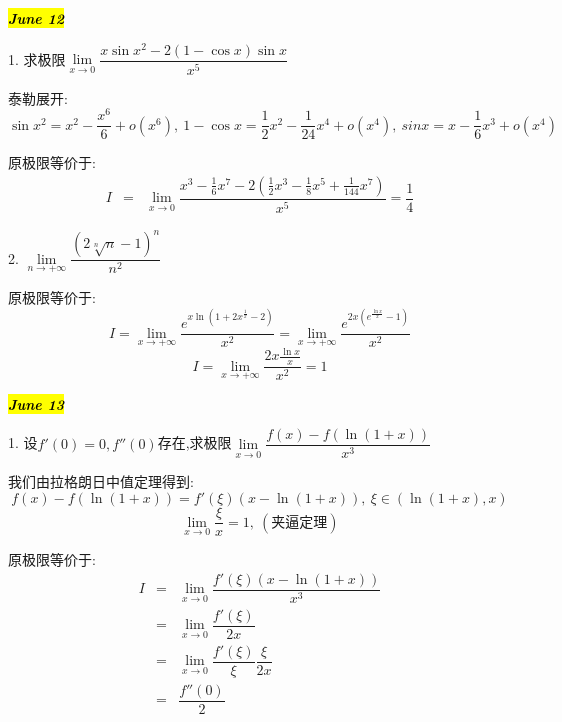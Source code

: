 \hl{\textbf{\textit{June 12}}}

1. 求极限$\lim\limits_{x\rightarrow 0 }\dfrac{x\sin x^2-2(1-\cos x)\sin x}{x^5}$
\begin{solution}
	
	泰勒展开: 
	$$\sin x^2=x^2-\dfrac{x^6}{6}+o(x^6),\ 1-\cos x=\dfrac{1}{2}x^2-\dfrac{1}{24}x^4+o(x^4),\ sin x=x-\dfrac{1}{6}x^3+o(x^4)$$
	
	原极限等价于: 
	\begin{eqnarray*}
		I&=&\lim\limits_{x\rightarrow 0}\dfrac{x^3-\frac{1}{6}x^7-2(\frac{1}{2}x^3-\frac{1}{8}x^5+\frac{1}{144}x^7)}{x^5}=\dfrac{1}{4}
	\end{eqnarray*}
\end{solution}

2. $\lim\limits_{n\rightarrow +\infty}\dfrac{(2\sqrt[n]{n}-1)^n}{n^2}$
\begin{solution}
	
	原极限等价于: 
	$$I=\lim\limits_{x\rightarrow +\infty}\dfrac{e^{x\ln(1+2x^{\frac{1}{x}}-2)}}{x^2}=\lim\limits_{x\rightarrow +\infty}\dfrac{e^{2x(e^{\frac{\ln x}{x}}-1)}}{x^2}$$
	$$I=\lim\limits_{x\rightarrow +\infty}\dfrac{2x\frac{\ln x}{x}}{x^2}=1$$
\end{solution}

\hl{\textbf{\textit{June 13}}}

1. 设$f'(0)=0,f''(0)$存在,求极限$\lim\limits_{x\rightarrow 0}\dfrac{f(x)-f(\ln(1+x))}{x^3}$
\begin{solution}
	
	我们由拉格朗日中值定理得到: 
	$$f(x)-f(\ln(1+x))=f'(\xi)(x-\ln(1+x)),\ \xi\in(\ln(1+x),x)$$
	$$\lim\limits_{x\rightarrow 0}\dfrac{\xi}{x}=1,\ (\text{夹逼定理})$$
	
	原极限等价于: 
	\begin{eqnarray*}
		I&=&\lim\limits_{x\rightarrow 0}\dfrac{f'(\xi)(x-\ln(1+x))}{x^3}\\
		&=&\lim\limits_{x\rightarrow 0}\dfrac{f'(\xi)}{2x}\\
		&=&\lim\limits_{x\rightarrow 0}\dfrac{f'(\xi)}{\xi}\dfrac{\xi}{2x}\\
		&=&\dfrac{f''(0)}{2}
	\end{eqnarray*}
\end{solution}

